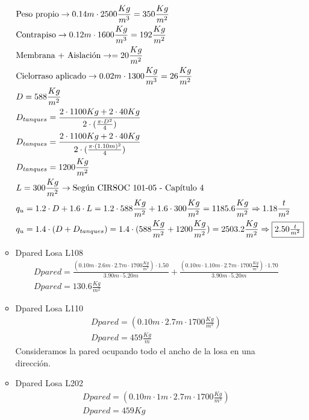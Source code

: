 \begin{enumerate}
\begin{itemize}
\begin{align*}
& \text{Peso propio} \rightarrow 0.14m \cdot 2500 \frac{Kg}{m^3} = 350 \frac{Kg}{m^2}\\
& \text{Contrapiso} \rightarrow 0.12m \cdot 1600 \frac{Kg}{m^3} = 192 \frac{Kg}{m^2}\\
& \text{Membrana + Aislación} \rightarrow = 20 \frac{Kg}{m^2}\\
& \text{Cielorraso aplicado} \rightarrow  0.02m \cdot 1300 \frac{Kg}{m^3} = 26 \frac{Kg}{m^2}\\
& D = 588 \frac{Kg}{m^2}\\
& D_{tanques} = \frac{2 \cdot 1100Kg + 2 \cdot 40Kg}{2 \cdot (\frac{\pi \cdot D^2}{4})}\\
& D_{tanques} = \frac{2 \cdot 1100Kg + 2 \cdot 40Kg}{2 \cdot (\frac{\pi \cdot (1.10m)^2}{4})}\\
& D_{tanques} = 1200 \frac{Kg}{m^2}\\
& L = 300 \frac{Kg}{m^2} \rightarrow \text{Según CIRSOC 101-05 - Capítulo 4}\\
& q_u = 1.2 \cdot D + 1.6 \cdot L = 1.2 \cdot 588 \frac{Kg}{m^2} + 1.6 \cdot 300 \frac{Kg}{m^2} = 1185.6 \frac{Kg}{m^2} \Rightarrow 1.18 \frac{t}{m^2}\\
& q_u = 1.4 \cdot (D + D_{tanques})= 1.4 \cdot (588 \frac{Kg}{m^2} + 1200 \frac{Kg}{m^2})= 2503.2 \frac{Kg}{m^2} \Rightarrow \framebox{$2.50 \frac{t}{m^2}$}
\end{align*}

\item Dpared Losa L108
\begin{align*}
& Dpared = \frac{(0.10m \cdot 2.6m \cdot 2.7m \cdot 1700 \frac{Kg}{m^3}) \cdot 1.50}{3.90m \cdot 5.20m} + \frac{(0.10m \cdot 1.10m \cdot 2.7m \cdot 1700 \frac{Kg}{m^3}) \cdot 1.70}{3.90m \cdot 5.20m}\\
& Dpared = 130.6 \frac{Kg}{m^2}
\end{align*}

\item Dpared Losa L110
\begin{align*}
& Dpared = (0.10m \cdot 2.7m \cdot 1700 \frac{Kg}{m^3}) \\
& Dpared = 459 \frac{Kg}{m}
\end{align*}
Consideramos la pared ocupando todo el ancho de la losa en una dirección.

\item Dpared Losa L202
\begin{align*}
& Dpared = (0.10m \cdot 1m \cdot 2.7m \cdot 1700 \frac{Kg}{m^3}) \\
& Dpared = 459Kg
\end{align*}


\end{itemize}
\end{enumerate}
